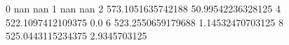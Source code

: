 0 nan nan
1 nan nan
2 573.1051635742188 50.99542236328125
4 522.1097412109375 0.0
6 523.2550659179688 1.14532470703125
8 525.0443115234375 2.9345703125
